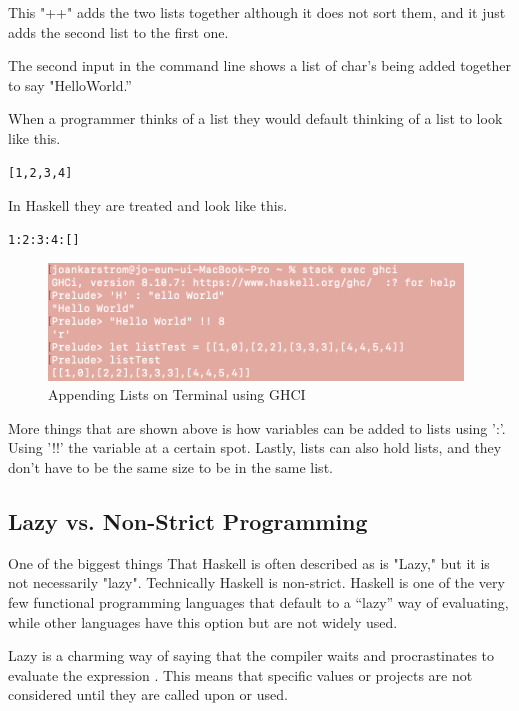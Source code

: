\documentclass{article}
\begin{document}
\medskip\noindent
This "++" adds the two lists together although it does not sort them, and it just adds the second list to the first one. 

\medskip\noindent
The second input in the command line shows a list of char's being added together to say "HelloWorld.” 

\medskip\noindent
When a programmer thinks of a list they would default thinking of a list to look like this.

\medskip\noindent
\begin{lstlisting}
[1,2,3,4]
\end{lstlisting}

\medskip\noindent
In Haskell they are treated and look like this.

\medskip\noindent
\begin{lstlisting}
1:2:3:4:[]
\end{lstlisting}

\medskip\noindent 
\begin{figure}[htp]
    \centering
    \includegraphics[width=11cm]{AppendingLists.png}
    \caption{Appending Lists on Terminal using GHCI}
    \label{fig:Appending lists}
\end{figure}

\medskip\noindent
More things that are shown above is how variables can be added to lists using ':'. Using '!!' the variable at a certain spot. Lastly, lists can also hold lists, and they don't have to be the same size to be in the same list.

\subsection{Lazy vs. Non-Strict Programming}

One of the biggest things That Haskell is often described as is "Lazy," but it is not necessarily "lazy". Technically Haskell is non-strict. Haskell is one of the very few functional programming languages that default to a “lazy” way of evaluating, while other languages have this option but are not widely used. 

\medskip\noindent
Lazy is a charming way of saying that the compiler waits and procrastinates to evaluate the expression \cite{LP}. This means that specific values or projects are not considered until they are called upon or used. 
\end{document}
